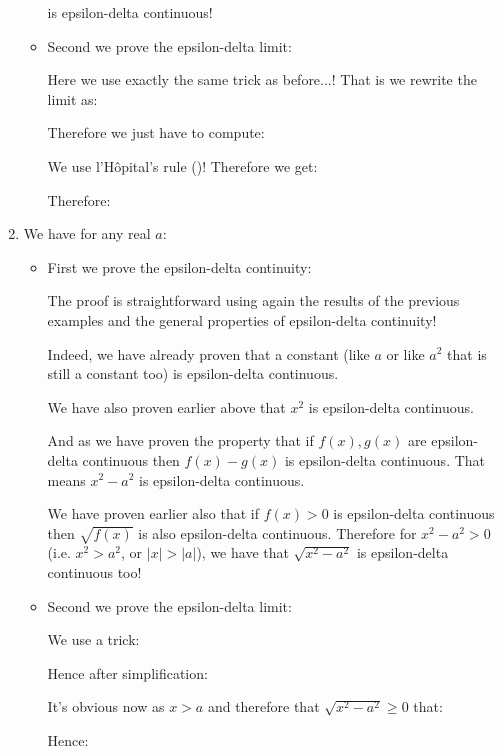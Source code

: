 \begin{enumerate}
\begin{itemize}
			is epsilon-delta continuous!
			
			\item Second we prove the epsilon-delta limit:
			
			Here we use exactly the same trick as before...! That is we rewrite the limit as:			
			
			Therefore we just have to compute:
			
			We use l'Hôpital's rule ()! Therefore we get:
			
			Therefore:
			
		\end{itemize}
		
		\item We have for any real $a$:
		
		
		\begin{itemize}
			\item First we prove the epsilon-delta continuity:
			
			
			The proof is straightforward using again the results of the previous examples and the general properties of epsilon-delta continuity!
			
			Indeed, we have already proven that a constant (like $a$ or like $a^2$ that is still a constant too) is epsilon-delta continuous.
			
			We have also proven earlier above that $x^2$ is epsilon-delta continuous.
			
			And as we have proven the property that if $f(x),g(x)$ are epsilon-delta continuous then $f(x)-g(x)$ is epsilon-delta continuous. That means $x^2-a^2$ is epsilon-delta continuous.
			
			We have proven earlier also that if $f(x)>0$ is epsilon-delta continuous then $\sqrt{f(x)}$ is also epsilon-delta continuous. Therefore for  $x^2-a^2>0$ (i.e. $x^2>a^2$, or $|x|>|a|$), we have that $\sqrt{x^2-a^2}$ is epsilon-delta continuous too!
			
			\item Second we prove the epsilon-delta limit:
			
			We use a trick:
			
			Hence after simplification:
			
			It's obvious now as $x>a$ and therefore that $\sqrt{x^2-a^2}\geq 0$ that:
			
			Hence:
			
		\end{itemize}
		

\end{enumerate}
